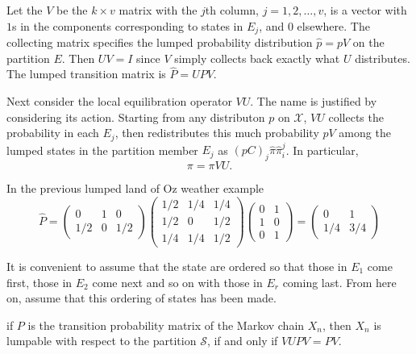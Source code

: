 \documentclass[12pt]{article}
\begin{document}
Let the  $V$ be the $k \times v$ matrix with the $j$th column,
\( j = 1, 2, \dots, v \), is a vector with $1$s in the components corresponding to
states in $E_j$, and $0$ elsewhere.  The collecting matrix specifies
the lumped probability distribution $\hat{p} = p V$ on the partition
$E$.   Then $UV = I$ since $V$ simply collects back exactly what $U$
distributes.   The lumped
transition matrix is \( \hat{P} = UPV \).

Next consider the local equilibration operator $VU$.  The name is
justified by considering its action.  Starting from any distributon
$p$ on $\mathcal{X}$, $VU$ collects the probability in each $E_j$,
then redistributes this much probability $pV$ among the lumped states
in the partition member $E_j$ as $(pC)_j \hat{\pi} \hat{\pi}_i^j$.  In
particular,
\[
  \pi = \pi VU. 
\]

\begin{example}
  In the previous lumped land of Oz weather example
  \[
    \hat{P} =
    \begin{pmatrix}
      0 & 1 & 0 \\
      1/2 & 0 & 1/2
    \end{pmatrix}
    \begin{pmatrix}
     1/2 & 1/4 & 1/4  \\
     1/2 & 0 & 1/2 \\
       1/4 & 1/4 & 1/2 
   \end{pmatrix}
   \begin{pmatrix}
     0 & 1 \\
     1 & 0 \\
     0 & 1
   \end{pmatrix} =
   \begin{pmatrix}
     0 & 1 \\
     1/4 & 3/4
   \end{pmatrix}
   \]
\end{example}


It is convenient to assume that the state are ordered so that those
in $E_1$ come first, those in $E_{2}$ come next and so on with those
in $E_r$ coming last.  From here on, assume that this ordering of
states has been made.


\begin{theorem}
  if $P$ is the transition probability matrix of the Markov chain
$X_n$, then $X_n$ is lumpable with respect to the partition $\mathcal{S}$, if and only if
\( VUPV = PV \).
\end{theorem}
\end{document}
